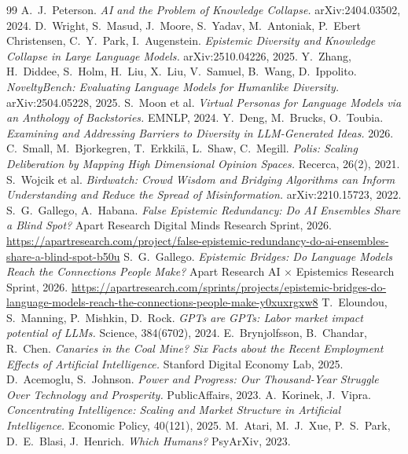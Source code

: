\documentclass[11pt]{article}
\begin{document}
\begin{thebibliography}{99}
 A.\ J.\ Peterson. \emph{AI and the Problem of Knowledge Collapse.} arXiv:2404.03502, 2024.
 D.\ Wright, S.\ Masud, J.\ Moore, S.\ Yadav, M.\ Antoniak, P.\ Ebert Christensen, C.\ Y.\ Park, I.\ Augenstein. \emph{Epistemic Diversity and Knowledge Collapse in Large Language Models.} arXiv:2510.04226, 2025.
 Y.\ Zhang, H.\ Diddee, S.\ Holm, H.\ Liu, X.\ Liu, V.\ Samuel, B.\ Wang, D.\ Ippolito. \emph{NoveltyBench: Evaluating Language Models for Humanlike Diversity.} arXiv:2504.05228, 2025.
 S.\ Moon et al. \emph{Virtual Personas for Language Models via an Anthology of Backstories.} EMNLP, 2024.
 Y.\ Deng, M.\ Brucks, O.\ Toubia. \emph{Examining and Addressing Barriers to Diversity in LLM-Generated Ideas.} 2026.
 C.\ Small, M.\ Bjorkegren, T.\ Erkkilä, L.\ Shaw, C.\ Megill. \emph{Polis: Scaling Deliberation by Mapping High Dimensional Opinion Spaces.} Recerca, 26(2), 2021.
 S.\ Wojcik et al. \emph{Birdwatch: Crowd Wisdom and Bridging Algorithms can Inform Understanding and Reduce the Spread of Misinformation.} arXiv:2210.15723, 2022.
 S.\ G.\ Gallego, A.\ Habana. \emph{False Epistemic Redundancy: Do AI Ensembles Share a Blind Spot?} Apart Research Digital Minds Research Sprint, 2026. \url{https://apartresearch.com/project/false-epistemic-redundancy-do-ai-ensembles-share-a-blind-spot-b50u}
 S.\ G.\ Gallego. \emph{Epistemic Bridges: Do Language Models Reach the Connections People Make?} Apart Research AI $\times$ Epistemics Research Sprint, 2026. \url{https://apartresearch.com/sprints/projects/epistemic-bridges-do-language-models-reach-the-connections-people-make-y0xuxrgxw8}
 T.\ Eloundou, S.\ Manning, P.\ Mishkin, D.\ Rock. \emph{GPTs are GPTs: Labor market impact potential of LLMs.} Science, 384(6702), 2024.
 E.\ Brynjolfsson, B.\ Chandar, R.\ Chen. \emph{Canaries in the Coal Mine? Six Facts about the Recent Employment Effects of Artificial Intelligence.} Stanford Digital Economy Lab, 2025.
 D.\ Acemoglu, S.\ Johnson. \emph{Power and Progress: Our Thousand-Year Struggle Over Technology and Prosperity.} PublicAffairs, 2023.
 A.\ Korinek, J.\ Vipra. \emph{Concentrating Intelligence: Scaling and Market Structure in Artificial Intelligence.} Economic Policy, 40(121), 2025.
 M.\ Atari, M.\ J.\ Xue, P.\ S.\ Park, D.\ E.\ Blasi, J.\ Henrich. \emph{Which Humans?} PsyArXiv, 2023.

\end{thebibliography}
\end{document}
